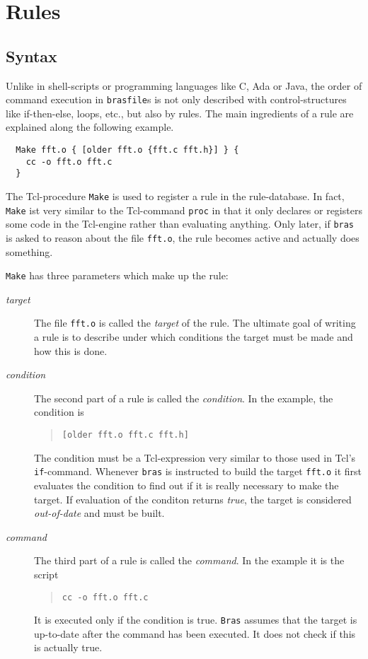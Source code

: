 \documentclass[11pt]{scrartcl}
\newcommand{\bras}{\texttt{bras}}
\newcommand{\Bras}{\texttt{Bras}}
\newcommand{\brasfile}{\texttt{brasfile}}
\begin{document}
\section{Rules}
\label{SecDefTerms}

\subsection{Syntax}
Unlike in shell-scripts or programming languages like C, Ada or Java,
the order of command execution in \brasfile{}s is not only described
with control-structures like if-then-else, loops, etc., but also by
rules.  The main ingredients of a rule are explained along the
following example.

\begin{verbatim}
  Make fft.o { [older fft.o {fft.c fft.h}] } {
    cc -o fft.o fft.c
  }
\end{verbatim}

The Tcl-procedure \texttt{Make} is used to register a rule in the
rule-database. In fact, \texttt{Make} ist very similar to the
Tcl-command \texttt{proc} in that it only declares or registers some
code in the Tcl-engine rather than evaluating anything. Only later, if 
\bras{} is asked to reason about the file \texttt{fft.o}, the rule
becomes active and actually does something.

\texttt{Make} has three parameters which make up the rule:

\begin{description}
\item[\textit{target}] The file \texttt{fft.o} is called the
  \textit{target} of the rule. The ultimate goal of writing a rule is
  to describe under which conditions the target must be made and how
  this is done. 
\item[\textit{condition}] The second part of a rule is called the
  \textit{condition}. In the example, the condition is
  \begin{quote}
  \texttt{[older fft.o {fft.c fft.h}]}
  \end{quote}
  The condition must be a Tcl-expression very similar to
  those used in Tcl's \texttt{if}-command. Whenever \bras{} is
  instructed to build the target \texttt{fft.o} it first evaluates the
  condition to find out if it is really necessary to make the
  target. If evaluation of the conditon returns \textit{true}, the
  target is considered \textit{out-of-date} and must be built.
\item[\textit{command}] The third part of a rule is called the
  \textit{command}. In the example it is the script
  \begin{quote}
    \texttt{cc -o fft.o fft.c}
  \end{quote}
  It is executed only if the condition is true. \Bras{} assumes that
  the target is up-to-date after the command has been executed. It
  does not check if this is actually true.
\end{description}
\end{document}
